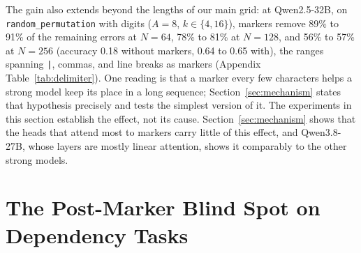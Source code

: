 \documentclass[10pt]{article} %
\newcommand{\task}[1]{\texttt{#1}}
\begin{document}
The gain also extends beyond the lengths of our main grid: at Qwen2.5-32B, on \task{random\_permutation} with digits ($A = 8$, $k \in \{4, 16\}$), markers remove 89\% to 91\% of the remaining errors at $N = 64$, 78\% to 81\% at $N = 128$, and 56\% to 57\% at $N = 256$ (accuracy 0.18 without markers, 0.64 to 0.65 with), the ranges spanning \texttt{|}, commas, and line breaks as markers (Appendix Table~\ref{tab:delimiter}). One reading is that a marker every few characters helps a strong model keep its place in a long sequence; Section~\ref{sec:mechanism} states that hypothesis precisely and tests the simplest version of it. The experiments in this section establish the effect, not its cause. Section~\ref{sec:mechanism} shows that the heads that attend most to markers carry little of this effect, and Qwen3.8-27B, whose layers are mostly linear attention, shows it comparably to the other strong models.

\begin{table}[!htbp]
\centering
\small
\caption{The tokenization-independent gain, by model and control format: the three-task means behind Finding~2 ($N \le 64$, $k \in \{1, 2, 4, 8, 16\}$, all alphabet sizes, no-marker accuracy length-matched). Share removed is $\rho$ of , blank where the no-marker accuracy leaves a denominator under 0.02. Appendix Table~\ref{tab:controlcells} gives all 48 cells with their $z$ values, which is where the significance counts quoted here come from.}
\label{tab:controlsummary}

\end{table}

\section{The Post-Marker Blind Spot on Dependency Tasks}
\label{sec:blindspot}
\end{document}
